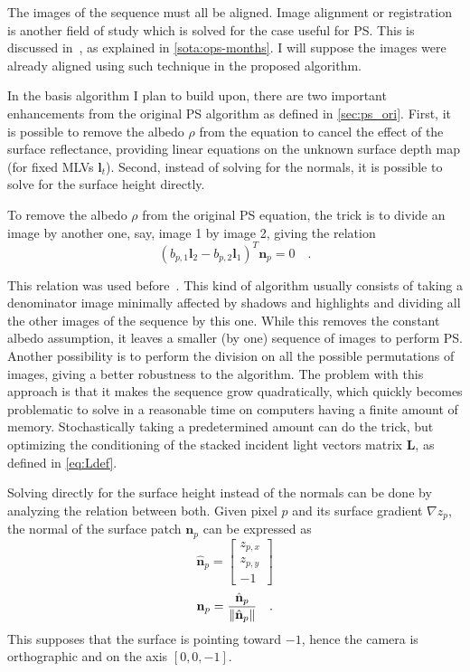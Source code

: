 The images of the sequence must all be aligned. Image alignment or registration is another field of study which is solved for the case useful for PS. This is discussed in~\cite{ackermann-cvpr-12}, as explained in \ref{sota:ops-months}. I will suppose the images were already aligned using such technique in the proposed algorithm.

In the basis algorithm I plan to build upon, there are two important enhancements from the original PS algorithm as defined in \ref{sec:ps_ori}. First, it is possible to remove the albedo $\rho$ from the equation to cancel the effect of the surface reflectance, providing linear equations on the unknown surface depth map (for fixed MLVs $\mathbf{l}_t$). Second, instead of solving for the normals, it is possible to solve for the surface height directly. 

To remove the albedo $\rho$ from the original PS equation, the trick is to divide an image by another one, say, image 1 by image 2, giving the relation
\begin{equation}
\label{eq:ratio_images}
\left( b_{p,1} \mathbf{l}_2 - b_{p,2} \mathbf{l}_1 \right)^T \mathbf{n}_p = 0  \quad.
\end{equation}

This relation was used before~\cite{yu-iccp-13,wu-pami-06}. This kind of algorithm usually consists of taking a denominator image minimally affected by shadows and highlights and dividing all the other images of the sequence by this one. While this removes the constant albedo assumption, it leaves a smaller (by one) sequence of images to perform PS. Another possibility is to perform the division on all the possible permutations of images, giving a better robustness to the algorithm. The problem with this approach is that it makes the sequence grow quadratically, which quickly becomes problematic to solve in a reasonable time on computers having a finite amount of memory. Stochastically taking a predetermined amount can do the trick, but optimizing the conditioning of the stacked incident light vectors matrix $\mathbf{L}$, as defined in \eqref{eq:Ldef}.
 
Solving directly for the surface height instead of the normals can be done by analyzing the relation between both. Given pixel $p$ and its surface gradient $\nabla z_p$, the normal of the surface patch $\mathbf{n}_p$ can be expressed as
\begin{equation}
\hat{\mathbf{n}}_p = 
\begin{bmatrix}
z_{p,x} \\
z_{p,y} \\
-1
\end{bmatrix}
\end{equation}
\begin{equation}
\mathbf{n}_p =
\frac{\hat{\mathbf{n}}_p}{\left\lVert\hat{\mathbf{n}}_p\right\rVert} \quad.
\end{equation}
This supposes that the surface is pointing toward $-1$, hence the camera is orthographic and on the axis $[0, 0, -1]$.

